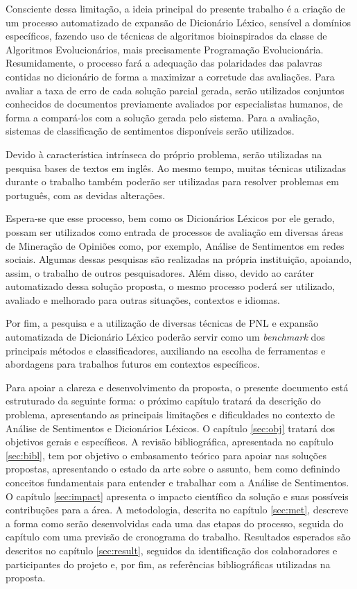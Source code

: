 \documentclass[a4paper,11pt]{article}
\begin{document}
Consciente dessa limitação, a ideia principal do presente trabalho é a criação de um processo automatizado de expansão de Dicionário Léxico, sensível a domínios específicos, fazendo uso de técnicas de algoritmos bioinspirados da classe de Algoritmos Evolucionários, mais precisamente Programação Evolucionária. Resumidamente, o processo fará a adequação das polaridades das palavras contidas no dicionário de forma a maximizar a corretude das avaliações. Para avaliar a taxa de erro de cada solução parcial gerada, serão utilizados conjuntos conhecidos de documentos previamente avaliados por especialistas humanos, de forma a compará-los com a solução gerada pelo sistema. Para a avaliação, sistemas de classificação de sentimentos disponíveis serão utilizados.

Devido à característica intrínseca do próprio problema, serão utilizadas na pesquisa bases de textos em inglês. Ao mesmo tempo, muitas técnicas utilizadas durante o trabalho também poderão ser utilizadas para resolver problemas em português, com as devidas alterações. 

Espera-se que esse processo, bem como os Dicionários Léxicos por ele gerado, possam ser utilizados como entrada de processos de avaliação em diversas áreas de Mineração de Opiniões como, por exemplo, Análise de Sentimentos em redes sociais. Algumas dessas pesquisas são realizadas na própria instituição, apoiando, assim, o trabalho de outros pesquisadores. Além disso, devido ao caráter automatizado dessa solução proposta, o mesmo processo poderá ser utilizado, avaliado e melhorado para outras situações, contextos e idiomas.

Por fim, a pesquisa e a utilização de diversas técnicas de PNL e expansão automatizada de Dicionário Léxico poderão servir como um \emph{benchmark} dos principais métodos e classificadores, auxiliando na escolha de ferramentas e abordagens para trabalhos futuros em contextos específicos.

Para apoiar a clareza e desenvolvimento da proposta, o presente documento está estruturado da seguinte forma: o próximo capítulo tratará da descrição do problema, apresentando as principais limitações e dificuldades no contexto de Análise de Sentimentos e Dicionários Léxicos. O capítulo \ref{sec:obj} tratará dos objetivos gerais e específicos. A revisão bibliográfica, apresentada no capítulo \ref{sec:bibl}, tem por objetivo o embasamento teórico para apoiar nas soluções propostas, apresentando o estado da arte sobre o assunto, bem como definindo conceitos fundamentais para entender e trabalhar com a Análise de Sentimentos. O capítulo \ref{sec:impact} apresenta o impacto científico da solução e suas possíveis contribuções para a área. A metodologia, descrita no capítulo \ref{sec:met}, descreve a forma como serão desenvolvidas cada uma das etapas do processo, seguida do capítulo com uma previsão de cronograma do trabalho. Resultados esperados são descritos no capítulo \ref{sec:result}, seguidos da identificação dos colaboradores e participantes do projeto e, por fim, as referências bibliográficas utilizadas na proposta.
\end{document}
